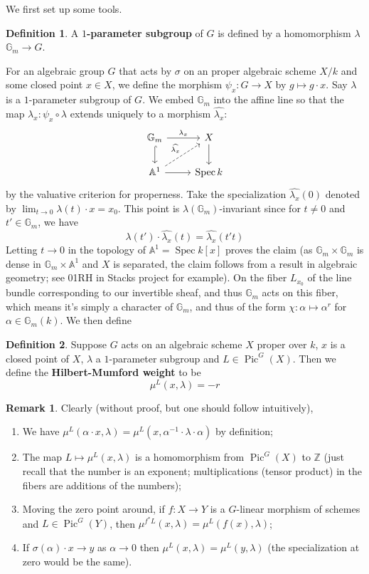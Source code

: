 \documentclass[12pt]{article}
\theoremstyle{remark}
\theoremstyle{definition}
\newtheorem{remark}{Remark}[section]
\newtheorem{definition}{Definition}[section]
\newcommand{\s}[0]{\sigma}
\newcommand{\Z}[0]{\mathbb{Z}}
\newcommand{\A}[0]{\mathbb{A}}
\newcommand{\G}[0]{\mathbb{G}}
\newcommand{\Spec}[0]{\operatorname{Spec}}
\newcommand{\Pic}[0]{\operatorname{Pic}}
\begin{document}
    We first set up some tools.
    \begin{definition}
        A \textbf{$1$-parameter subgroup} of $G$ is defined by a homomorphism $\lambda$ $\G_m\to G$.
    \end{definition}
    For an algebraic group $G$ that acts by $\s$ on an proper algebraic scheme $X/k$ and some closed point $x\in X$, we define the morphism $\psi_x:G\to X$ by $g\mapsto g\cdot x$. Say $\lambda$ is a $1$-parameter subgroup of $G$. We embed $\G_m$ into the affine line so that the map $\lambda_x:\psi_x\circ\lambda$ extends uniquely to a morphism 
    $\widehat{\lambda_x}$:
    \[
        \begin{tikzcd}
            \mathbb G_m \arrow[r, "\lambda_x"] \arrow[d, hook]              & X \arrow[d] \\
            \mathbb A^1 \arrow[r] \arrow[ru, "\widehat{\lambda_x}", dashed] & \Spec k    
        \end{tikzcd}  
    \]
    by the valuative criterion for properness. Take the specialization $\widehat{\lambda_x}(0)$ denoted by $\lim_{t\to 0}\lambda(t)\cdot x=x_0$. This point is $\lambda(\G_m)$-invariant since for $t\neq 0$ and $t'\in\G_m$, we have
    \[\lambda(t')\cdot \widehat{\lambda_x}(t)=\widehat{\lambda_x}(t't)\]
    Letting $t\to 0$ in the topology of $\mathbb A^1=\Spec k[x]$ proves the claim (as $\mathbb G_m\times\mathbb G_m$ is dense in $\mathbb G_m\times\A^1$ and $X$ is separated, the claim follows from a result in algebraic geometry; see 01RH in Stacks project for example). On the fiber $L_{x_0}$ of the line bundle corresponding to our invertible sheaf, and thus $\G_m$ acts on this fiber, which means it's simply a character of $\G_m$, and thus of the form $\chi:\alpha\mapsto\alpha^r$ for $\alpha\in \G_m(k)$. We then define
    \begin{definition}
        Suppose $G$ acts on an algebraic scheme $X$ proper over $k$, $x$ is a closed point of $X$, $\lambda$ a $1$-parameter subgroup and $L\in\Pic^G(X)$. Then we define the \textbf{Hilbert-Mumford weight} to be
        \[\mu^L(x,\lambda)=-r\]
    \end{definition}
    \begin{remark}
        Clearly (without proof, but one should follow intuitively), 
        \begin{enumerate}[\normalfont(i)]
            \item We have $\mu^L(\alpha\cdot x,\lambda)=\mu^L(x,\alpha^{-1}\cdot\lambda\cdot\alpha)$ by definition;
            \item The map $L\mapsto\mu^L(x,\lambda)$ is a homomorphism from $\Pic^G(X)$ to $\Z$ (just recall that the number is an exponent; multiplications (tensor product) in the fibers are additions of the numbers);
            \item Moving the zero point around, if $f:X\to Y$ is a $G$-linear morphism of schemes and $L\in\Pic^G(Y)$, then $\mu^{f^*L}(x,\lambda)=\mu^L(f(x), \lambda)$;
            \item If $\s(\alpha)\cdot x\to y$ as $\alpha\to 0$ then $\mu^L(x,\lambda)=\mu^L(y,\lambda)$ (the specialization at zero would be the same).
        \end{enumerate}
    \end{remark}
\end{document}
